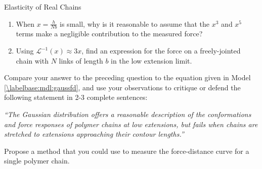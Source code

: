 \begin{activity}[extension]{Elasticity of Real Chains}
\begin{ctqs}
		\begin{enumerate}
			\item When $x=\frac{h}{Nb}$ is small, why is it reasonable to assume that the $x^3$ and $x^5$ terms make a negligible contribution to the measured force?
			
				\begin{solution}[1in]
				\end{solution}
			
			\item Using $\mathcal{L}^{-1}(x) \approx 3x$, find an expression for the force on a freely-jointed chain with $N$ links of length $b$ in the low extension limit.
			
				\begin{solution}[1.5in]
				\end{solution}
			
		\end{enumerate}
		
	\question Compare your answer to the preceding question to the equation given in Model \ref{\labelbase:mdl:gaussfd}, and use your observations to critique or defend the following statement in 2-3 complete sentences:
	
		\emph{``The Gaussian distribution offers a reasonable description of the conformations and force responses of polymer chains at low extensions, but fails when chains are stretched to extensions approaching their contour lengths.''}
			
				\begin{solution}[2in]
				\end{solution}
	
\end{ctqs}
	

\begin{exercises}

	\exercise Propose a method that you could use to measure the force-distance curve for a single polymer chain.
	
	
%
%
%		
\end{exercises}
	
\end{activity}